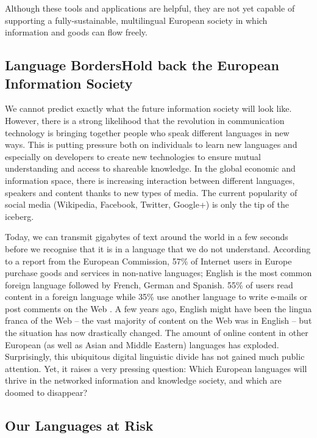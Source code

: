 \documentclass[]{../../metanetpaper}
\begin{document}
\begin{multicols}{2}
Although these tools and applications are helpful, they are not yet capable of supporting a fully-sustainable, multilingual European society in which information and goods can flow freely.

\subsection[Language Borders Hold back the European Information Society]{Language Borders\newline Hold back the European Information Society}

We cannot predict exactly what the future information society will look like. However, there is a strong likelihood that the revolution in communication technology is bringing together people who speak different languages in new ways. This is putting pressure both on individuals to learn new languages and especially on developers to create new technologies to ensure mutual understanding and access to shareable knowledge. In the global economic and information space, there is increasing interaction between different languages, speakers and content thanks to new types of media. The current popularity of social media (Wikipedia, Facebook, Twitter, Google+) is only the tip of the iceberg.


Today, we can transmit gigabytes of text around the world in a few seconds before we recognise that it is in a language that we do not understand. According to a report from the European Commission, 57\% of Internet users in Europe purchase goods and services in non-native languages; English is the most common foreign language followed by French, German and Spanish. 55\% of users read content in a foreign language while 35\% use another language to write e-mails or post comments on the Web \cite{EC1}. A few years ago, English might have been the lingua franca of the Web -- the vast majority of content on the Web was in English -- but the situation has now drastically changed. The amount of online content in other European (as well as Asian and Middle Eastern) languages has exploded.
Surprisingly, this ubiquitous digital linguistic divide has not gained much public attention. Yet, it raises a very pressing question: Which European languages will thrive in the networked information and knowledge society, and which are doomed to disappear?

\subsection{Our Languages at Risk}


\end{multicols}
\end{document}
